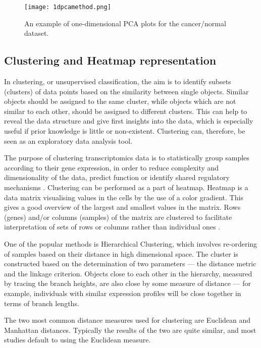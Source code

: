     
            \begin{figure}[h]
            \centering
            \texttt{[image: 1dpcamethod.png]}
            \caption{An example of one-dimensional PCA plots for the cancer/normal dataset. }
            \label{fig:1dpcamethod}
            \end{figure}
   
  
    \subsection{Clustering and Heatmap representation}
    
    In clustering, or unsupervised classification, the aim is to identify subsets (clusters) of data points based on the similarity between single objects. Similar objects should be assigned to the same cluster, while objects which are not similar to each other, should be assigned to different clusters. This can help to reveal the data structure and give first insights into the data, which is especially useful if prior knowledge is little or non-existent. Clustering can, therefore, be seen as an exploratory data analysis tool. 
        
    The purpose of clustering transcriptomics data is to statistically group samples according to their gene expression, in order to reduce complexity and dimensionality of the data, predict function or identify shared regulatory mechanisms \cite{Metsalu2015ClustVis:Heatmap}. Clustering can be performed as a part of heatmap. Heatmap is a data matrix visualising values in the cells by the use of a color gradient. This gives a good overview of the largest and smallest values in the matrix. Rows (genes) and/or columns (samples) of the matrix are clustered to facilitate interpretation of sets of rows or columns rather than individual ones \cite{Metsalu2015ClustVis:Heatmap}.
    
    
    One of the popular methods is Hierarchical Clustering, which involves re-ordering of samples based on their distance in high dimensional space. The cluster is constructed based on the determination of two parameters — the distance metric and the linkage criterion. Objects close to each other in the hierarchy, measured by tracing the branch heights, are also close by some measure of distance — for example, individuals with similar expression profiles will be close together in terms of branch lengths.
    
    \newpage
    The two most common distance measures used for clustering are Euclidean and Manhattan distances. Typically the results of the two are quite similar, and most studies default to using the Euclidean measure. 
    
